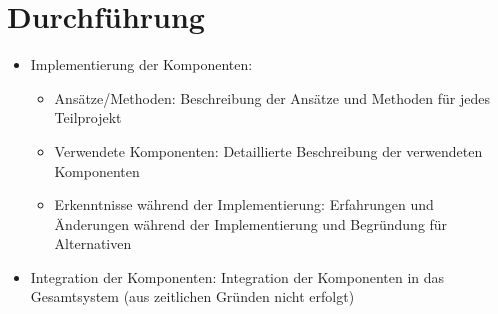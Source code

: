 \newpage
\section{Durchführung}






\begin{itemize}

	\item Implementierung der Komponenten:
	\begin{itemize}
		\item Ansätze/Methoden: Beschreibung der Ansätze und Methoden für jedes Teilprojekt
		\item Verwendete Komponenten: Detaillierte Beschreibung der verwendeten Komponenten
		\item Erkenntnisse während der Implementierung: Erfahrungen und Änderungen während der Implementierung und Begründung für Alternativen
	\end{itemize}
	\item Integration der Komponenten: Integration der Komponenten in das Gesamtsystem (aus zeitlichen Gründen nicht erfolgt)
\end{itemize}


